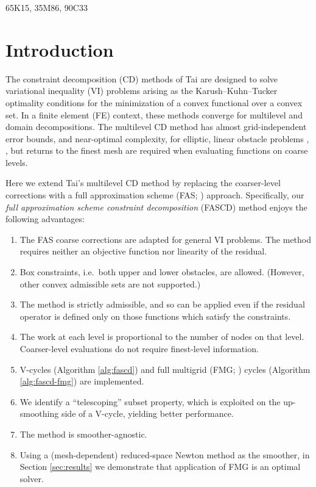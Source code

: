 \documentclass[review,hidelinks,onefignum,onetabnum,final]{siamart220329}  %
\begin{document}
\begin{MSCcodes}
65K15, 35M86, 90C33
\end{MSCcodes}


\section{Introduction} \label{sec:intro}

The constraint decomposition (CD) methods of Tai \cite{Tai2003} are designed to solve variational inequality (VI) problems arising as the Karush--Kuhn--Tucker optimality conditions for the minimization of a convex functional over a convex set.  In a finite element (FE) context, these methods converge for multilevel and domain decompositions.  The multilevel CD method has almost grid-independent error bounds, and near-optimal complexity, for elliptic, linear obstacle problems \cite[Subsection 5.4]{Tai2003}, \cite[Theorem 4.6]{GraeserKornhuber2009}, but returns to the finest mesh are required when evaluating functions on coarse levels.

Here we extend Tai's multilevel CD method by replacing the coarser-level corrections with a full approximation scheme (FAS; \cite{Brandt1977,Bruneetal2015}) approach.  Specifically, our \emph{full approximation scheme constraint decomposition} (FASCD) method enjoys the following advantages:
\renewcommand{\labelenumi}{\emph{(\roman{enumi})}}
\begin{enumerate}
\item The FAS coarse corrections are adapted for general VI problems. The method requires neither an objective function nor linearity of the residual.
\item Box constraints, i.e.~both upper and lower obstacles, are allowed.  (However, other convex admissible sets are not supported.)
\item The method is strictly admissible, and so can be applied even if the residual operator is defined only on those functions which satisfy the constraints.
\item The work at each level is proportional to the number of nodes on that level.  Coarser-level evaluations do not require finest-level information.
\item V-cycles (Algorithm \ref{alg:fascd}) and full multigrid (FMG; \cite{Trottenbergetal2001}) cycles (Algorithm \ref{alg:fascd-fmg}) are implemented.
\item We identify a ``telescoping'' subset property, which is exploited on the up-smoothing side of a V-cycle, yielding better performance.
\item The method is smoother-agnostic.
\item Using a (mesh-dependent) reduced-space Newton method \cite{BensonMunson2006} as the smoother, in Section \ref{sec:results} we demonstrate that application of FMG is an optimal solver.
\end{enumerate}
\end{document}
